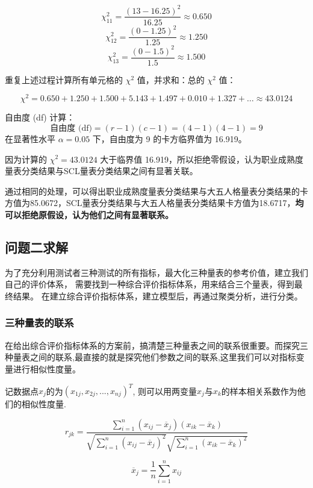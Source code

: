 \documentclass[withoutpreface,bwprint]{cumcmthesis} %
\begin{document}
\[
\chi^2_{11} = \frac{(13 - 16.25)^2}{16.25} \approx 0.650
\]
\[
\chi^2_{12} = \frac{(0 - 1.25)^2}{1.25} \approx 1.250
\]
\[
\chi^2_{13} = \frac{(0 - 1.5)^2}{1.5} \approx 1.500
\]

重复上述过程计算所有单元格的 \(\chi^2\) 值，并求和：总的 \(\chi^2\) 值：

\[
\chi^2 = 0.650 + 1.250 + 1.500 + 5.143 + 1.497 + 0.010 + 1.327 + \ldots \approx 43.0124
\]

自由度 (df) 计算：
\[
\text{自由度 (df)} = (r - 1)(c - 1) = (4 - 1)(4 - 1) = 9
\]
在显著性水平 \(\alpha = 0.05\) 下，自由度为 9 的卡方临界值为 16.919。

因为计算的 \(\chi^2 = 43.0124\) 大于临界值 16.919，所以拒绝零假设，认为职业成熟度量表分类结果与SCL量表分类结果之间有显著关联。

通过相同的处理，可以得出职业成熟度量表分类结果与大五人格量表分类结果的卡方值为85.0672，SCL量表分类结果与大五人格量表分类结果卡方值为18.6717，\textbf{均可以拒绝原假设，认为他们之间有显著联系。}



\subsection{问题二求解}

为了充分利用测试者三种测试的所有指标，最大化三种量表的参考价值，建立我们自己的评价体系，
需要找到一种综合评价指标体系，用来结合三个量表，得到最终结果。
在建立综合评价指标体系，建立模型后，再通过聚类分析，进行分类。

\subsubsection{三种量表的联系}

在给出综合评价指标体系的方案前，搞清楚三种量表之间的联系很重要。而探究三种量表之间的联系,最直接的就是探究他们参数之间的联系,这里我们可以对指标变量进行相似性度量。

记数据点$x_j$的为$(x_{1j}, x_{2j}, ... , x_{nj})^T$, 则可以用两变量$x_j$与$x_k$的样本相关系数作为他们的相似性度量.

\begin{equation}
r_{jk} = \frac{\sum_{i=1}^n (x_{ij} - \overline{x}_j)(x_{ik} - \overline{x}_k)}{\sqrt{\sum_{i=1}^n (x_{ij} - \overline{x}_j)^2} \sqrt{\sum_{i=1}^n (x_{ik} - \overline{x}_k)^2}}
\end{equation}

\begin{equation}
\overline{x}_j = \frac{1}{n} \sum_{i=1}^n x_{ij}
\end{equation}
\end{document}
